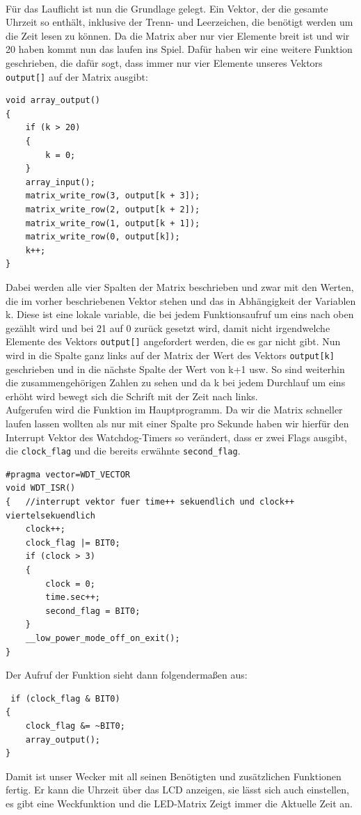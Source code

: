 \documentclass[openright,twoside,11pt,a4paper]{scrartcl}
\begin{document}
\begin{flushleft}
	 	\ \\
	 	Für das Lauflicht ist nun die Grundlage gelegt. Ein Vektor, der die gesamte Uhrzeit so enthält, inklusive der Trenn- und Leerzeichen, die benötigt werden um die Zeit lesen zu können. Da die Matrix aber nur vier Elemente breit ist und wir 20 haben kommt nun das laufen ins Spiel. Dafür haben wir eine weitere Funktion geschrieben, die dafür sogt, dass immer nur vier Elemente unseres Vektors \lstinline[]|output[]| auf der Matrix ausgibt:
	 	\begin{lstlisting}
void array_output()
{
	if (k > 20)
	{
		k = 0;
	}
	array_input();
	matrix_write_row(3, output[k + 3]);
	matrix_write_row(2, output[k + 2]);
	matrix_write_row(1, output[k + 1]);
	matrix_write_row(0, output[k]);
	k++;
}
	 	\end{lstlisting}
	 	Dabei werden alle vier Spalten der Matrix beschrieben und zwar mit den Werten, die im vorher beschriebenen Vektor stehen und das in Abhängigkeit der Variablen k. Diese ist eine lokale variable, die bei jedem Funktionsaufruf um eins nach oben gezählt wird und bei 21 auf 0 zurück gesetzt wird, damit nicht irgendwelche Elemente des Vektors \lstinline[]|output[]| angefordert werden, die es gar nicht gibt. Nun wird in die Spalte ganz links auf der Matrix der Wert des Vektors \lstinline[]|output[k]| geschrieben und in die nächste Spalte  der Wert von k+1 usw. So sind weiterhin die zusammengehörigen Zahlen zu sehen und da k bei jedem Durchlauf um eins erhöht wird bewegt sich die Schrift mit der Zeit nach links.\\
	 	Aufgerufen wird die Funktion im Hauptprogramm. Da wir die Matrix schneller laufen lassen wollten als nur mit einer Spalte pro Sekunde haben wir hierfür den Interrupt Vektor des Watchdog-Timers so verändert, dass er zwei Flags ausgibt, die \lstinline[]|clock_flag| und die bereits erwähnte \lstinline[]|second_flag|. \newpage
	 	\begin{lstlisting}
#pragma vector=WDT_VECTOR    
void WDT_ISR()
{	//interrupt vektor fuer time++ sekuendlich und clock++ viertelsekuendlich
	clock++;
	clock_flag |= BIT0;
	if (clock > 3)
	{
		clock = 0;
		time.sec++;
		second_flag = BIT0;
	}
	__low_power_mode_off_on_exit();
}
	 	\end{lstlisting}
	 	Der Aufruf der Funktion sieht dann folgendermaßen aus:
	 	\begin{lstlisting}
 if (clock_flag & BIT0)
{
	clock_flag &= ~BIT0;
	array_output();
}
	 	\end{lstlisting}
	 	Damit ist unser Wecker mit all seinen Benötigten und zusätzlichen Funktionen fertig. Er kann die Uhrzeit über das LCD anzeigen, sie lässt sich auch einstellen, es gibt eine Weckfunktion und die LED-Matrix Zeigt immer die Aktuelle Zeit an.\\

\end{flushleft}
\end{document}
